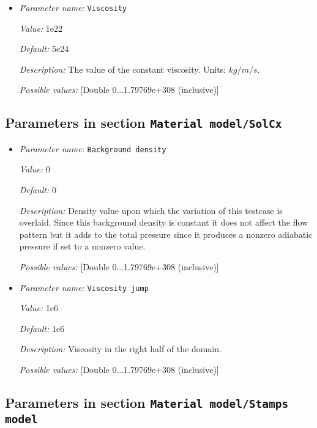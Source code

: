 \begin{itemize}
{\it Default:} 0.0


{\it Description:} The temperature dependence of viscosity. Dimensionless exponent.


{\it Possible values:} [Double 0...1.79769e+308 (inclusive)]
\item {\it Parameter name:} {\tt Viscosity}


{\it Value:} 1e22


{\it Default:} 5e24


{\it Description:} The value of the constant viscosity. Units: $kg/m/s$.


{\it Possible values:} [Double 0...1.79769e+308 (inclusive)]
\end{itemize}

\subsection{Parameters in section \tt Material model/SolCx}
\label{parameters:Material_20model/SolCx}

\begin{itemize}
\item {\it Parameter name:} {\tt Background density}


{\it Value:} 0


{\it Default:} 0


{\it Description:} Density value upon which the variation of this testcase is overlaid. Since this background density is constant it does not affect the flow pattern but it adds to the total pressure since it produces a nonzero adiabatic pressure if set to a nonzero value.


{\it Possible values:} [Double 0...1.79769e+308 (inclusive)]
\item {\it Parameter name:} {\tt Viscosity jump}


{\it Value:} 1e6


{\it Default:} 1e6


{\it Description:} Viscosity in the right half of the domain.


{\it Possible values:} [Double 0...1.79769e+308 (inclusive)]
\end{itemize}

\subsection{Parameters in section \tt Material model/Stamps model}
\label{parameters:Material_20model/Stamps_20model}

